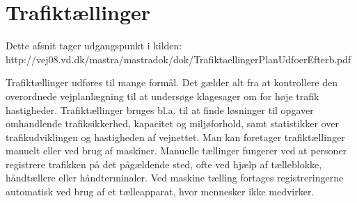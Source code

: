 \section{Trafiktællinger}
\label{sub:trafiktaellinger}
Dette afsnit tager udgangspunkt i kilden:
\\ http://vej08.vd.dk/mastra/mastradok/dok/TrafiktaellingerPlanUdfoerEfterb.pdf

Trafiktællinger udføres til mange formål. Det gælder alt fra at kontrollere den overordnede vejplanlægning til at undersøge klagesager om for høje trafik hastigheder. Trafiktællinger bruges bl.a. til at finde løsninger til opgaver omhandlende trafiksikkerhed, kapacitet og miljøforhold, samt statistikker over trafikudviklingen og hastigheden af vejnettet. Man kan foretager trafiktællinger manuelt eller ved brug af maskiner.
Manuelle tællinger fungerer ved at personer registrere trafikken på det pågældende sted, ofte ved hjælp af tælleblokke, håndtællere eller håndterminaler. Ved maskine tælling fortages registreringerne automatisk ved brug af et tælleapparat, hvor mennesker ikke medvirker.

